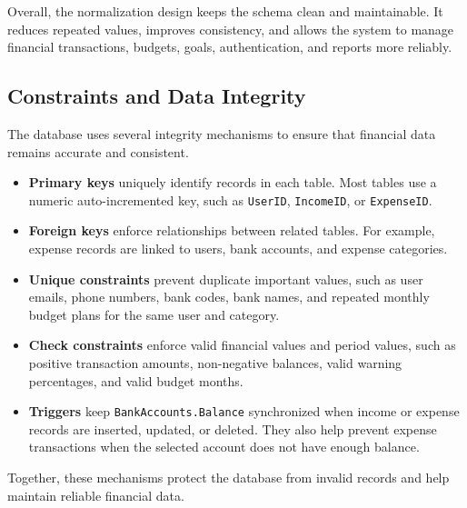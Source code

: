 \documentclass{article}
\begin{document}
Overall, the normalization design keeps the schema clean and maintainable. It reduces repeated values, improves consistency, and allows the system to manage financial transactions, budgets, goals, authentication, and reports more reliably.

\subsection{Constraints and Data Integrity}

The database uses several integrity mechanisms to ensure that financial data remains accurate and consistent.

\begin{itemize}
    \item \textbf{Primary keys} uniquely identify records in each table. Most tables use a numeric 
    auto-incremented key, such as \texttt{UserID}, \texttt{IncomeID}, or \texttt{ExpenseID}.

    \item \textbf{Foreign keys} enforce relationships between related tables. For example, expense records 
    are linked to users, bank accounts, and expense categories.

    \item \textbf{Unique constraints} prevent duplicate important values, such as user emails, phone numbers, 
    bank codes, bank names, and repeated monthly budget plans for the same user and category.

    \item \textbf{Check constraints} enforce valid financial values and period values, such as positive 
    transaction amounts, non-negative balances, valid warning percentages, and valid budget months.

    \item \textbf{Triggers} keep \texttt{BankAccounts.Balance} synchronized when income or expense records 
    are inserted, updated, or deleted. They also help prevent expense transactions when the selected account 
    does not have enough balance.
\end{itemize}

Together, these mechanisms protect the database from invalid records and help maintain reliable financial data.

\end{document}
